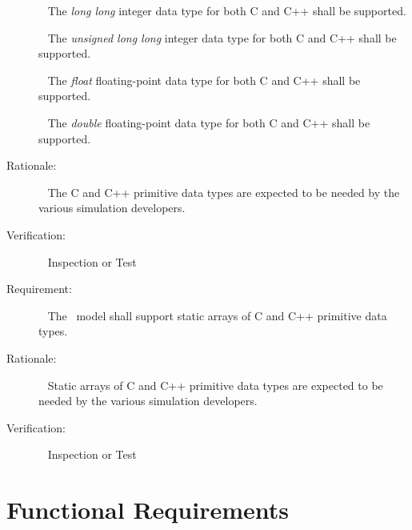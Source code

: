 \documentclass[twoside,11pt,titlepage]{report}
\begin{document}
\begin{description}
    \label{reqt:primitive_data_types_llong}
      \ \newline
      The {\em long long} integer data type for both C and C++
      shall be supported.

    \label{reqt:primitive_data_types_ullong}
      \ \newline
      The {\em unsigned long long} integer data type for both C and C++
      shall be supported.

    \label{reqt:primitive_data_types_float}
      \ \newline
      The {\em float} floating-point data type for both C and C++
      shall be supported.

    \label{reqt:primitive_data_types_double}
      \ \newline
      The {\em double} floating-point data type for both C and C++
      shall be supported.

  \item[Rationale:]\ \newline
    The C and C++ primitive data types are expected to be
    needed by the various simulation developers.

  \item[Verification:]\ \newline
    Inspection or Test
\end{description}


\label{reqt:static_arrays_of_primitive_data_types}
\begin{description}
  \item[Requirement:]\ \newline
    The \TrickHLA\ model shall support static arrays of C and C++
    primitive data types.

  \item[Rationale:]\ \newline
    Static arrays of C and C++ primitive data types are expected to be
    needed by the various simulation developers.

  \item[Verification:]\ \newline
    Inspection or Test
\end{description}


\section{Functional Requirements}\label{sec:func_reqts}
\end{document}
